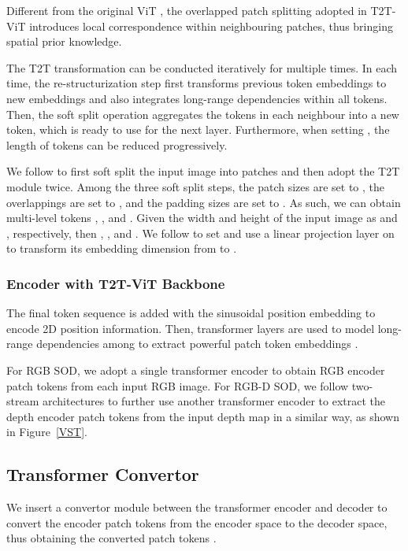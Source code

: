 \documentclass[10pt,twocolumn,letterpaper]{article}
\begin{document}
Different from the original ViT \cite{dosovitskiy2020image}, the overlapped patch splitting adopted in T2T-ViT introduces local correspondence within neighbouring patches, thus bringing spatial prior knowledge.

The T2T transformation can be conducted iteratively for multiple times. In each time, the re-structurization step first transforms previous token embeddings to new embeddings and also integrates long-range dependencies within all tokens. Then, the soft split operation aggregates the tokens in each  neighbour into a new token, which is ready to use for the next layer. Furthermore, when setting , the length of tokens can be reduced progressively.


We follow \cite{yuan2021tokens} to first soft split the input image into patches and then adopt the T2T module twice. Among the three soft split steps, the patch sizes are set to , the overlappings are set to , and the padding sizes are set to .
As such, we can obtain multi-level tokens , , and .
Given the width and height of the input image as  and , respectively, then , , and . We follow \cite{yuan2021tokens} to set  and use a linear projection layer on  to transform its embedding dimension from  to .




\vspace{-3mm}
\subsubsection{Encoder with T2T-ViT Backbone}
The final token sequence  is added with the sinusoidal position embedding \cite{vaswani2017attention} to encode 2D position information. Then,  transformer layers are used to model long-range dependencies among  to extract powerful patch token embeddings .

For RGB SOD, we adopt a single transformer encoder to obtain RGB encoder patch tokens  from each input RGB image. For RGB-D SOD, we follow two-stream architectures to further use another transformer encoder to extract the depth encoder patch tokens  from the input depth map in a similar way, as shown in Figure~\ref{VST}.


\subsection{Transformer Convertor}
We insert a convertor module between the transformer encoder and decoder to convert the encoder patch tokens  from the encoder space to the decoder space, thus obtaining the converted patch tokens .
\end{document}
